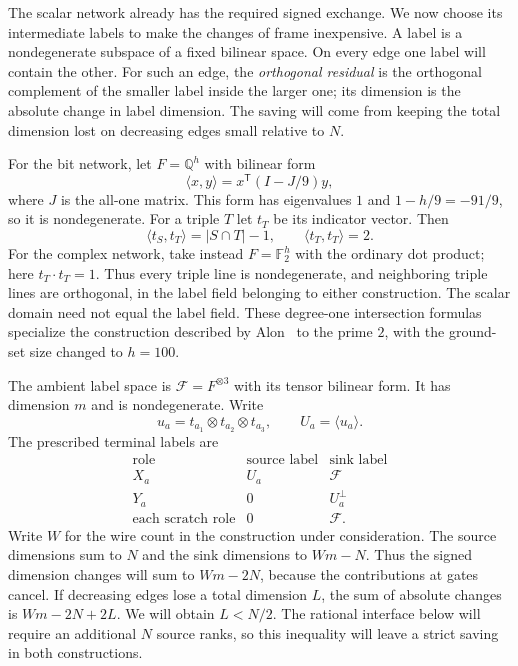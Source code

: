 The scalar network already has the required signed exchange. We now
choose its intermediate labels to make the changes of frame inexpensive.
A label is a nondegenerate subspace of a fixed bilinear space. On every
edge one label will contain the other. For such an edge, the
\emph{orthogonal residual} is the orthogonal complement of the smaller label inside
the larger one; its dimension is the absolute change in label dimension.
The saving will come from keeping the total dimension lost on decreasing
edges small relative to $N$.

For the bit network, let $F=\mathbb Q^h$ with bilinear form
\[
 \langle x,y\rangle=x^{\mathsf T}(I-J/9)y,
\]
where $J$ is the all-one matrix.  This form has eigenvalues $1$ and
$1-h/9=-91/9$, so it is nondegenerate.  For a triple $T$ let $t_T$ be
its indicator vector.  Then
\[
 \langle t_S,t_T\rangle=|S\cap T|-1,
 \qquad \langle t_T,t_T\rangle=2.
\]
For the complex network, take instead $F=\mathbb F_2^h$ with the
ordinary dot product; here $t_T\cdot t_T=1$.
Thus every triple line is nondegenerate, and neighboring triple lines
are orthogonal, in the label field belonging to either construction.
The scalar domain need not equal the label field.
These degree-one intersection formulas specialize the construction
described by Alon~\cite[Section~3, remark after Theorem~1.1]{Alon1998}
to the prime $2$, with the ground-set size changed to $h=100$.

The ambient label space is $\mathcal F=F^{\otimes3}$ with its tensor
bilinear form.  It has dimension $m$ and is nondegenerate.  Write
\[
 u_a=t_{a_1}\otimes t_{a_2}\otimes t_{a_3},\qquad U_a=\langle u_a\rangle.
\]
The prescribed terminal labels are
\[
\begin{array}{c|cc}
\text{role}&\text{source label}&\text{sink label}\\ \hline
X_a&U_a&\mathcal F\\
Y_a&0&U_a^\perp\\
\text{each scratch role}&0&\mathcal F.
\end{array}
\]
Write $W$ for the wire count in the construction under consideration.
The source dimensions sum to $N$ and the sink dimensions to $Wm-N$.
Thus the signed dimension changes will sum to $Wm-2N$, because the
contributions at gates cancel. If decreasing edges lose a total
dimension $L$, the sum of absolute changes is $Wm-2N+2L$.
We will obtain $L<N/2$. The rational interface below will require
an additional $N$ source ranks, so this inequality will leave a strict
saving in both constructions.

